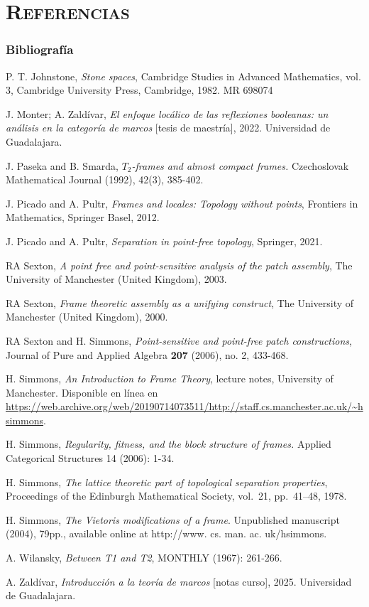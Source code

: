 \documentclass[compress,12pt]{beamer}
\begin{document}
\End

\section*{\textsc{Referencias}}
\begin{frame}[allowframebreaks]
\frametitle{Bibliografía}
\begin{thebibliography}{20}

 P. T. Johnstone, \textit{Stone spaces}, Cambridge Studies in Advanced Mathematics, vol. 3, Cambridge University Press, Cambridge, 1982. MR 698074

 J. Monter; A. Zaldívar, \textit{El enfoque locálico de las reflexiones booleanas: un análisis en la categoría de marcos} [tesis de maestría], 2022. Universidad de Guadalajara.

 J. Paseka and B. Smarda, \textit{$ T_2 $-frames and almost compact frames.} Czechoslovak Mathematical Journal (1992), 42(3), 385-402.

 J. Picado and A. Pultr, \textit{Frames and locales: Topology without points}, Frontiers in Mathematics, Springer Basel, 2012.

 J. Picado and A. Pultr, \textit{Separation in point-free topology}, Springer, 2021.

 RA Sexton, \textit{A point free and point-sensitive analysis of the patch assembly}, The University of Manchester (United Kingdom), 2003.

 RA Sexton, \textit{Frame theoretic assembly as a unifying construct}, The University of Manchester (United Kingdom), 2000.

 RA Sexton and H. Simmons, \textit{Point-sensitive and point-free patch constructions}, Journal of Pure and Applied Algebra \textbf{207} (2006), no. 2, 433-468.

 H. Simmons, \textit{An Introduction to Frame Theory}, lecture notes, University of Manchester. Disponible en línea en \url{https://web.archive.org/web/20190714073511/http://staff.cs.manchester.ac.uk/~hsimmons}.

 H. Simmons, \textit{Regularity, fitness, and the block structure of frames.} Applied Categorical Structures 14 (2006): 1-34.

 H. Simmons, \textit{The lattice theoretic part of topological separation properties}, Proceedings of the Edinburgh Mathematical Society, vol.~21, pp.~41--48, 1978.

 H. Simmons, \textit{The Vietoris modifications of a frame}. Unpublished manuscript (2004), 79pp., available online at http://www. cs. man. ac. uk/hsimmons.

 A. Wilansky, \textit{Between T1 and T2}, MONTHLY (1967): 261-266.

 A. Zaldívar, \textit{Introducción a la teoría de marcos} [notas curso], 2025. Universidad de Guadalajara.
\end{thebibliography}
\end{frame}
\end{document}
